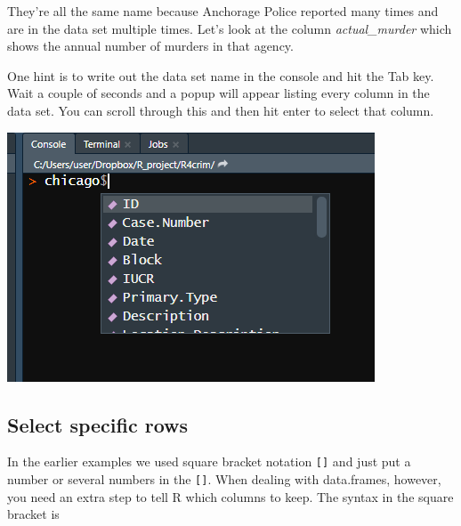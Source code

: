 \documentclass[
  12pt,
]{book}
\newenvironment{Shaded}{\begin{snugshade}}{\end{snugshade}}
\newcommand{\CommentTok}[1]{\textcolor[rgb]{0.56,0.35,0.01}{\textit{#1}}}
\newcommand{\DecValTok}[1]{\textcolor[rgb]{0.00,0.00,0.81}{#1}}
\newcommand{\KeywordTok}[1]{\textcolor[rgb]{0.13,0.29,0.53}{\textbf{#1}}}
\newcommand{\NormalTok}[1]{#1}
\newcommand{\OperatorTok}[1]{\textcolor[rgb]{0.81,0.36,0.00}{\textbf{#1}}}
\begin{document}
\begin{Shaded}
\end{Shaded}

They're all the same name because Anchorage Police reported many times and are in the data set multiple times. Let's look at the column \emph{actual\_murder} which shows the annual number of murders in that agency.

\begin{Shaded}
\end{Shaded}

One hint is to write out the data set name in the console and hit the Tab key. Wait a couple of seconds and a popup will appear listing every column in the data set. You can scroll through this and then hit enter to select that column.

\includegraphics{images/tab_example.png}

\hypertarget{select-specific-rows}{%
\subsection{Select specific rows}\label{select-specific-rows}}

In the earlier examples we used square bracket notation \texttt{{[}{]}} and just put a number or several numbers in the \texttt{{[}{]}}. When dealing with data.frames, however, you need an extra step to tell R which columns to keep. The syntax in the square bracket is
\end{document}
